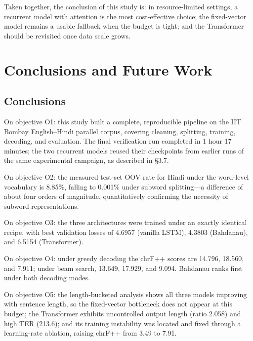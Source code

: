 \documentclass[a4paper,12pt]{vpcoe}
\begin{document}
Taken together, the conclusion of this study is: in resource-limited settings, a recurrent model with attention is the most cost-effective choice; the fixed-vector model remains a usable fallback when the budget is tight; and the Transformer should be revisited once data scale grows.

\chapter{Conclusions and Future Work}

\section{Conclusions}
On objective O1: this study built a complete, reproducible pipeline on the IIT Bombay English--Hindi parallel corpus, covering cleaning, splitting, training, decoding, and evaluation. The final verification run completed in 1 hour 17 minutes; the two recurrent models reused their checkpoints from earlier runs of the same experimental campaign, as described in \S 3.7.

On objective O2: the measured test-set OOV rate for Hindi under the word-level vocabulary is 8.85\%, falling to 0.001\% under subword splitting---a difference of about four orders of magnitude, quantitatively confirming the necessity of subword representations.

On objective O3: the three architectures were trained under an exactly identical recipe, with best validation losses of 4.6957 (vanilla LSTM), 4.3803 (Bahdanau), and 6.5154 (Transformer).

On objective O4: under greedy decoding the chrF++ scores are 14.796, 18.560, and 7.911; under beam search, 13.649, 17.929, and 9.094. Bahdanau ranks first under both decoding modes.

On objective O5: the length-bucketed analysis shows all three models improving with sentence length, so the fixed-vector bottleneck does not appear at this budget; the Transformer exhibits uncontrolled output length (ratio 2.058) and high TER (213.6); and its training instability was located and fixed through a learning-rate ablation, raising chrF++ from 3.49 to 7.91.
\end{document}
